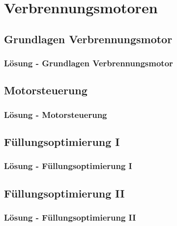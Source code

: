 


\part{Verbrennungsmotoren}

\chapter{Grundlagen Verbrennungsmotor}
 \newpage
\section{Lösung - Grundlagen Verbrennungsmotor}

\chapter{Motorsteuerung}
 \newpage
\section{Lösung - Motorsteuerung}

\chapter{Füllungsoptimierung I}
 \newpage
\section{Lösung - Füllungsoptimierung I}

\chapter{Füllungsoptimierung II}
 \newpage
\section{Lösung - Füllungsoptimierung II}

